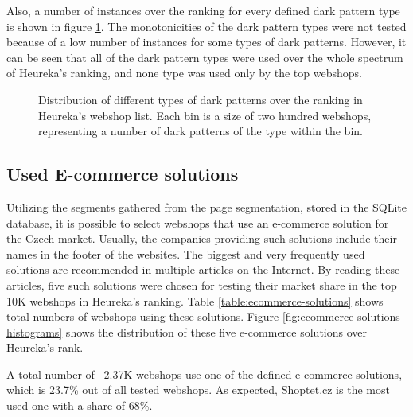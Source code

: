     Also, a number of instances over the ranking for every defined dark pattern type is shown in figure \ref{fig:dp-types-in-ranking}. The monotonicities of the dark pattern types were not tested because of a low number of instances for some types of dark patterns. However, it can be seen that all of the dark pattern types were used over the whole spectrum of Heureka's ranking, and none type was used only by the top webshops.
    
    \begin{figure}
        \begin{center}
            
        \end{center}
        \caption{Distribution of different types of dark patterns over the ranking in Heureka's webshop list. Each bin is a size of two hundred webshops, representing a number of dark patterns of the type within the bin.}
        \label{fig:dp-types-in-ranking}
    \end{figure}
    
    \subsection{Used E-commerce solutions}
    Utilizing the segments gathered from the page segmentation, stored in the SQLite database, it is possible to select webshops that use an e-commerce solution for the Czech market. Usually, the companies providing such solutions include their names in the footer of the websites. The biggest and very frequently used solutions are recommended in multiple articles on the Internet\cite{5nej}\cite{lupacz}\cite{nastrojeproweb}\cite{entuzio}\cite{compari}. By reading these articles, five such solutions were chosen for testing their market share in the top 10K webshops in Heureka's ranking. Table \ref{table:ecommerce-solutions} shows total numbers of webshops using these solutions. Figure \ref{fig:ecommerce-solutions-histograms} shows the distribution of these five e-commerce solutions over Heureka's rank. 
    
    A total number of ~2.37K webshops use one of the defined e-commerce solutions, which is 23.7\% out of all tested webshops. As expected, Shoptet.cz is the most used one with a share of 68\%.
    
